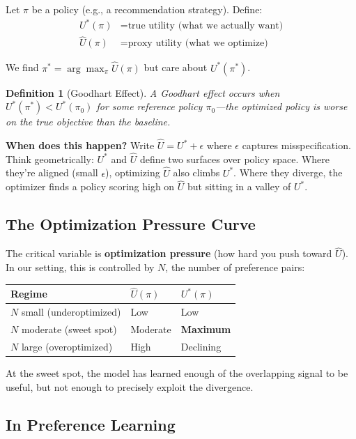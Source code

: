 \documentclass[11pt]{article}
\newtheorem{definition}{Definition}
\begin{document}
Let $\pi$ be a policy (e.g., a recommendation strategy). Define:
\begin{align}
  U^*(\pi) &= \text{true utility (what we actually want)} \\
  \hat{U}(\pi) &= \text{proxy utility (what we optimize)}
\end{align}

We find $\pi^* = \arg\max_\pi \hat{U}(\pi)$ but care about $U^*(\pi^*)$.

\begin{definition}[Goodhart Effect]
A Goodhart effect occurs when $U^*(\pi^*) < U^*(\pi_0)$ for some
reference policy $\pi_0$---the optimized policy is \emph{worse} on the
true objective than the baseline.
\end{definition}

\textbf{When does this happen?} Write $\hat{U} = U^* + \epsilon$ where
$\epsilon$ captures misspecification. Think geometrically: $U^*$ and
$\hat{U}$ define two surfaces over policy space. Where they're aligned
(small $\epsilon$), optimizing $\hat{U}$ also climbs $U^*$. Where they
diverge, the optimizer finds a policy scoring high on $\hat{U}$ but
sitting in a valley of $U^*$.

\subsection{The Optimization Pressure Curve}

The critical variable is \textbf{optimization pressure} (how hard you
push toward $\hat{U}$). In our setting, this is controlled by $N$, the
number of preference pairs:

\begin{center}
\begin{tabular}{lll}
\toprule
Regime & $\hat{U}(\pi)$ & $U^*(\pi)$ \\
\midrule
$N$ small (underoptimized) & Low & Low \\
$N$ moderate (sweet spot) & Moderate & \textbf{Maximum} \\
$N$ large (overoptimized) & High & Declining \\
\bottomrule
\end{tabular}
\end{center}

At the sweet spot, the model has learned enough of the overlapping
signal to be useful, but not enough to precisely exploit the divergence.

\subsection{In Preference Learning}
\end{document}

